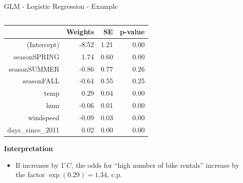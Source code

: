 \documentclass[11pt,compress,t,notes=noshow, aspectratio=169, xcolor=table]{beamer}
\begin{document}
\begin{frame}{GLM - Logistic Regression - Example}
\begin{columns}[T]
\begin{column}{0.45\textwidth}
\begin{table}[ht]
\centering
\scriptsize
\begin{tabular}{rrrr}
  \hline
 & Weights & SE & p-value \\ 
  \hline
(Intercept) & -8.52 & 1.21 & 0.00 \\ 
  seasonSPRING & 1.74 & 0.60 & 0.00 \\ 
  seasonSUMMER & -0.86 & 0.77 & 0.26 \\ 
  seasonFALL & -0.64 & 0.55 & 0.25 \\ 
  temp & 0.29 & 0.04 & 0.00 \\ 
  hum & -0.06 & 0.01 & 0.00 \\ 
  windspeed & -0.09 & 0.03 & 0.00 \\ 
  days\_since\_2011 & 0.02 & 0.00 & 0.00 \\ 
   \hline
\end{tabular}
\end{table}
\pause
\textbf{Interpretation}
\begin{itemize}
    \item If  increases by 1$^\circ C$, the odds for ``high number of bike rentals'' increase by the factor $\exp (0.29) = 1.34$, c.p.
\end{itemize}
\end{column}
\hfill
\begin{column}{0.5\textwidth}

\end{column}
\end{columns}
\end{frame}
\end{document}
